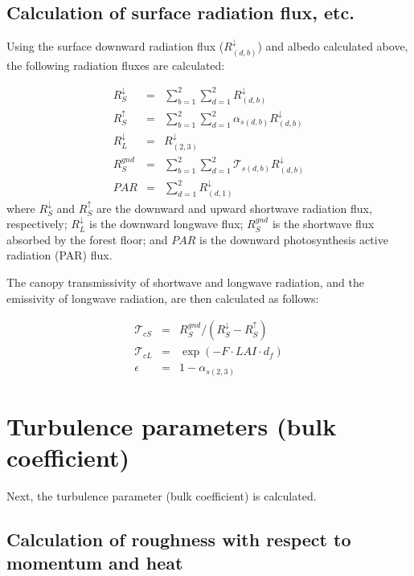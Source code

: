 \hypertarget{calculation-of-surface-radiation-flux-etc.}{%
\subsection{Calculation of surface radiation flux, etc.}\label{calculation-of-surface-radiation-flux-etc.}}

Using the surface downward radiation flux (\(R^{\downarrow}_{(d,b)}\)) and albedo calculated above, the following radiation fluxes are calculated:

\begin{eqnarray}
 R^{\downarrow}_S &=& \sum_{b=1}^2\sum_{d=1}^2 R^{\downarrow}_{(d,b)} \\
 R^{\uparrow}_S &=& \sum_{b=1}^2\sum_{d=1}^2 \alpha_{s(d,b)} R^{\downarrow}_{(d,b)} \\
 R^{\downarrow}_L &=& R^{\downarrow}_{(2,3)} \\
 R^{gnd}_S &=& \sum_{b=1}^2\sum_{d=1}^2 {\mathcal{T}}_{s(d,b)} R^{\downarrow}_{(d,b)} \\
 PAR &=& \sum_{d=1}^2 R^{\downarrow}_{(d,1)}
\end{eqnarray} where \(R^{\downarrow}_S\) and \(R^{\uparrow}_S\) are the downward and upward shortwave radiation flux, respectively; \(R^{\downarrow}_L\) is the downward longwave flux; \(R^{gnd}_S\) is the
shortwave flux absorbed by the forest floor; and \(PAR\) is the downward photosynthesis active radiation (PAR) flux.

The canopy transmissivity of shortwave and longwave radiation, and the emissivity of longwave radiation, are then calculated as follows:

\begin{eqnarray}
 {\mathcal{T}}_{cS} &=& R^{gnd}_S / ( R^{\downarrow}_S - R^{\uparrow}_S ) \\
 {\mathcal{T}}_{cL} &=& \exp( - F \cdot LAI \cdot d_f ) \\
 \epsilon &=& 1 - \alpha_{s(2,3)}
\end{eqnarray}

\hypertarget{turbulence-parameters-bulk-coefficient}{%
\section{Turbulence parameters (bulk coefficient)}\label{turbulence-parameters-bulk-coefficient}}

Next, the turbulence parameter (bulk coefficient) is calculated.

\hypertarget{calculation-of-roughness-with-respect-to-momentum-and-heat}{%
\subsection{Calculation of roughness with respect to momentum and heat}\label{calculation-of-roughness-with-respect-to-momentum-and-heat}}

